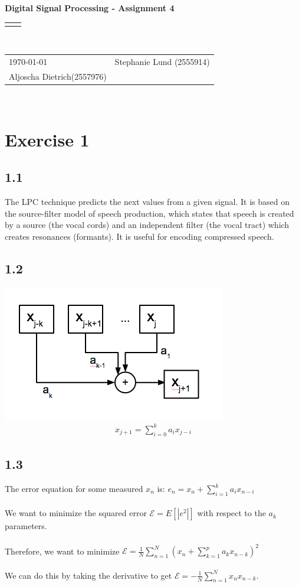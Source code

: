 \documentclass[12pt]{article}
\renewcommand{\title}[1]{\textbf{#1}\\}
\renewcommand{\line}{\begin{tabularx}{\textwidth}{X>{\raggedleft}X}\hline\\\end{tabularx}\\[-0.5cm]}
\newcommand{\leftright}[2]{\begin{tabularx}{\textwidth}{X>{\raggedleft}X}#1%
& #2\\\end{tabularx}\\[-0.5cm]}
\begin{document}
\title{Digital Signal Processing - Assignment 4}
\line
\leftright{\today}{Stephanie Lund (2555914)\\Aljoscha Dietrich(2557976)} %

\section*{Exercise 1}

\subsection*{1.1}
The LPC technique predicts the next values from a given signal. It is based on the source-filter model of speech production, which states that speech is created by a source (the vocal cords) and an independent filter (the vocal tract) which creates resonances (formants). It is useful for encoding compressed speech.

\subsection*{1.2}
\includegraphics[scale=0.65]{hw4-2.png}
\begin{align*}
	x_{j+1} = \sum_{i=0}^{k} a_i x_{j-i}
\end{align*}

\subsection*{1.3}
The error equation for some measured $x_n$ is: $e_n = x_n + \sum_{i=1}^k a_i x_{n-i}$\\\\
We want to minimize the squared error $\mathcal{E} = E[ |e^2| ]$ with respect to the $a_k$ parameters.\\\\
Therefore, we want to minimize $\mathcal{E} = \frac{1}{N} \sum_{n=1}^N (x_n + \sum_{k=1}^p a_k x_{n-k})^2$\\\\
We can do this by taking the derivative to get $\mathcal{E} = - \frac{1}{N} \sum_{n=1}^N x_n x_{n-k}$.
\end{document}
